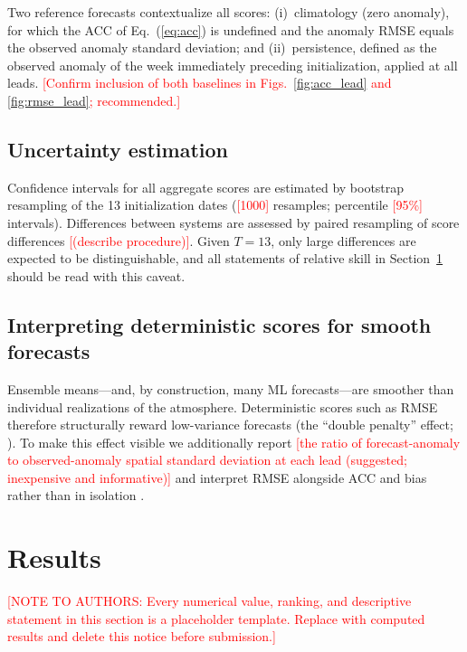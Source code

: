 \documentclass[11pt]{article}
\newcommand{\ph}[1]{\textcolor{red}{[#1]}}
\begin{document}
Two reference forecasts contextualize all scores: (i)~climatology
(zero anomaly), for which the ACC of Eq.~(\ref{eq:acc}) is undefined
and the anomaly RMSE equals the observed anomaly standard deviation;
and (ii)~persistence, defined as the observed anomaly of the week
immediately preceding initialization, applied at all leads.
\ph{Confirm inclusion of both baselines in Figs.~\ref{fig:acc_lead}
and \ref{fig:rmse_lead}; recommended.}

\subsection{Uncertainty estimation}\label{sec:uncertainty}

Confidence intervals for all aggregate scores are estimated by
bootstrap resampling of the 13 initialization dates (\ph{1000}
resamples; percentile \ph{95\%} intervals). Differences between
systems are assessed by paired resampling of score differences
\ph{(describe procedure)}. Given $T=13$, only large differences are
expected to be distinguishable, and all statements of relative skill
in Section~\ref{sec:results} should be read with this caveat.

\subsection{Interpreting deterministic scores for smooth forecasts}
\label{sec:smoothing}

Ensemble means---and, by construction, many ML forecasts---are
smoother than individual realizations of the atmosphere. Deterministic
scores such as RMSE therefore structurally reward low-variance
forecasts (the ``double penalty'' effect;
\citealp{wilks2019,benbouallegue2024}). To make this effect visible we
additionally report \ph{the ratio of forecast-anomaly to
observed-anomaly spatial standard deviation at each lead (suggested;
inexpensive and informative)} and interpret RMSE alongside ACC and
bias rather than in isolation \citep{murphy1988}.

\section{Results}\label{sec:results}

\ph{NOTE TO AUTHORS: Every numerical value, ranking, and descriptive
statement in this section is a placeholder template. Replace with
computed results and delete this notice before submission.}
\end{document}
